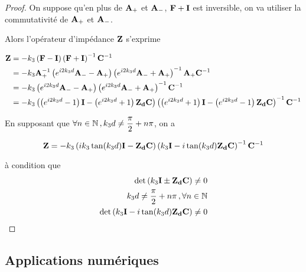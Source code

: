 \begin{proof}
            On suppose qu'en plus de $\mathbf{A}_+$ et $\mathbf{A}_-$, $\mathbf{F} + \mathbf{I}$ est inversible, on va utiliser la commutativité de $\mathbf{A}_+$ et $\mathbf{A}_-$.

            Alors l'opérateur d'impédance $\mathbf{Z}$ s'exprime

            \begin{align}
                \mathbf{Z}
                &=-k_3\left(\mathbf{F} - \mathbf{I} \right)\left(\mathbf{F}+ \mathbf{I} \right)^{-1}\mathbf{C}^{-1}
                \\
                &=-k_3\mathbf{A}_+^{-1}\left(e^{i2 k_3 d}\mathbf{A}_- - \mathbf{A}_+ \right)\left(e^{i2 k_3 d}\mathbf{A}_- + \mathbf{A}_+ \right)^{-1}\mathbf{A}_+\mathbf{C}^{-1}
                \\
                &= -k_3\left( e^{i2 k_3 d} \mathbf{A}_- -  \mathbf{A}_+\right)
                \left( e^{i2 k_3 d} \mathbf{A}_- + \mathbf{A}_+ \right)^{-1}\mathbf{C}^{-1}
                \\
                &= -k_3\left(\left( e^{i2 k_3 d} - 1 \right)\mathbf{I} - \left( e^{i2 k_3 d} + 1 \right) \mathbf{Z_d}\mathbf{C} \right)
                \left( \left( e^{i2 k_3 d} + 1 \right)\mathbf{I} - \left( e^{i2 k_3 d} - 1 \right)\mathbf{Z_d}\mathbf{C} \right)^{-1}\mathbf{C}^{-1}   
            \end{align}

            En supposant que $\forall n \in \mathbb N \,, k_3d\not = \dfrac{\pi}{2}+n\pi$, on a

            \begin{equation}
            \mathbf{Z} = -k_3\left(ik_3\tan(k_3 d)\mathbf{I} - \mathbf{Z_d}\mathbf{C} \right)
                \left( k_3\mathbf{I} - i\tan(k_3 d)\mathbf{Z_d}\mathbf{C} \right)^{-1}\mathbf{C}^{-1} 
            \end{equation}

            à condition que 
            \begin{align}
                \det\left(k_3\mathbf{I} \pm \mathbf{Z_d}\mathbf{C} \right) \not = 0 \\
                k_3d\not = \dfrac{\pi}{2}+n\pi\,, \forall n \in \mathbb N \\
                \det\left(k_3\mathbf{I} - i\tan(k_3d)\mathbf{Z_d}\mathbf{C}\right) \not = 0
            \end{align}

        \end{proof}


    \subsection{Applications numériques}

